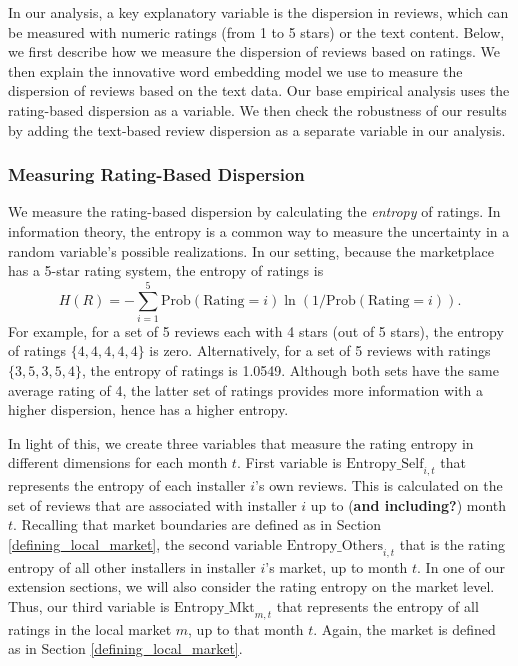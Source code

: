 \documentclass[msom,blindrev]{informs3}
\begin{document}
In our analysis, a key explanatory variable is the dispersion in reviews, which can be measured with numeric ratings (from 1 to 5 stars) or the text content. Below, we first describe how we measure the dispersion of reviews based on ratings. We then explain the innovative word embedding model we use to measure the dispersion of reviews based on the text data. Our base empirical analysis uses the rating-based dispersion as a variable. We then check the robustness of our results by adding the text-based review dispersion as a separate variable in our analysis.

\subsubsection{Measuring Rating-Based Dispersion} \label{Subsec: Define Ent}
We measure the rating-based dispersion by calculating the \emph{entropy} of ratings. In information theory, the entropy is a common way to measure  the uncertainty in a random variable's possible realizations. In our setting, because the marketplace has a 5-star rating system, the entropy of ratings is
\begin{equation}\label{def: entropy}
H(R)=-\sum_{i=1}^{5} \text{Prob}(\text{Rating}=i) \ln(1/\text{Prob}(\text{Rating}=i)).
\end{equation}
For example, for a set of 5 reviews each with 4 stars (out of 5 stars), the entropy of ratings $\{4,4,4,4,4\}$ is zero. Alternatively, for a set of 5 reviews with ratings $\{3,5,3,5,4\}$, the entropy of ratings is 1.0549. Although both sets have the same average rating of 4, the latter set of ratings provides more information with a higher dispersion, hence has a higher entropy.


In light of this, we create three variables that measure the rating entropy in different dimensions for each month $t$. First variable is $\text{Entropy\_Self}_{i,t}$ that represents the entropy of each installer $i$'s own reviews. This is calculated on the set of reviews that are associated with installer $i$ up to (\textbf{and including?}) month $t$. Recalling that market boundaries are defined as in Section \ref{defining_local_market}, the second variable $\text{Entropy\_Others}_{i,t}$ that is the rating entropy of all other installers in installer $i$'s market, up to month $t$. In one of our extension sections, we will also consider the rating entropy on the market level. Thus, our third variable is $\text{Entropy\_Mkt}_{m,t}$ that represents the entropy of all ratings in the local market $m$, up to that month $t$.  Again, the market is defined as in Section \ref{defining_local_market}.
\end{document}
